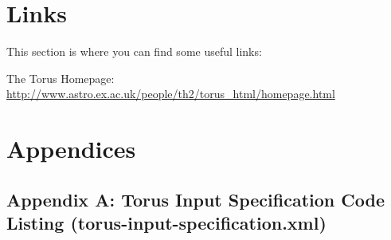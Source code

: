 \documentclass[a4paper,10pt]{article}
\begin{document}
\section{Links}
This section is where you can find some useful links:

\begin{list}{-}{}
\item The Torus Homepage:\\
\url{http://www.astro.ex.ac.uk/people/th2/torus_html/homepage.html}

\end{list}

\pagebreak

\section{Appendices}

\subsection{Appendix A: Torus Input Specification Code Listing (torus-input-specification.xml)}
\end{document}
